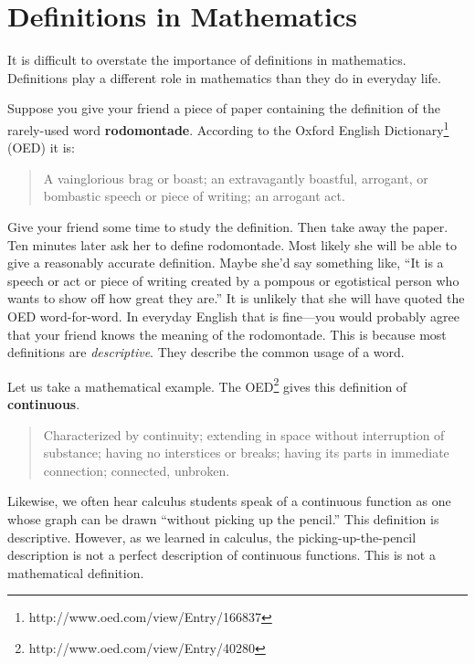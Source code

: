 \chapter{Definitions in Mathematics}
\label{appendix:definitions}

It is difficult to overstate the importance of definitions in mathematics. Definitions play a different role in mathematics than they do in everyday life. 

Suppose you give your friend a piece of paper containing the definition of the rarely-used word \textbf{rodomontade}. According to the Oxford English Dictionary\footnote{http://www.oed.com/view/Entry/166837} (OED) it is:
\begin{quote}
A vainglorious brag or boast; an extravagantly boastful, arrogant, or bombastic speech or piece of writing; an arrogant act.
\end{quote}
Give your friend some time to study the definition. Then take away the paper. Ten minutes later ask her to define rodomontade. Most likely she will be able to give a reasonably accurate definition. Maybe she'd say something like, ``It is a speech or act or piece of writing created by a pompous or egotistical person who wants to show off how great they are.'' It is unlikely that she will have quoted the OED word-for-word. In everyday English that is fine---you would probably agree that your friend knows the meaning of the rodomontade. This is because most definitions are \emph{descriptive}. They describe the common usage of a word. 

Let us take a mathematical example. The OED\footnote{http://www.oed.com/view/Entry/40280}  gives this definition of \textbf{continuous}.
\begin{quote}
Characterized by continuity; extending in space without interruption of substance; having no interstices or breaks; having its parts in immediate connection; connected, unbroken.
\end{quote}
Likewise, we often hear calculus students speak of a continuous function as one whose graph can be drawn ``without picking up the pencil.'' This definition is descriptive. However, as we learned in calculus, the picking-up-the-pencil description is not a perfect description of continuous functions. This is not a mathematical definition. 

